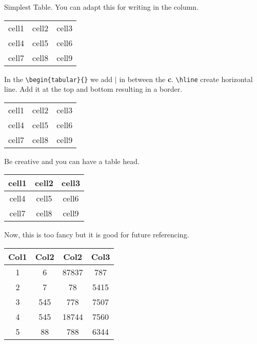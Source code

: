 \documentclass{article}
\begin{document}
Simplest Table. You can adapt this for writing in the column.

\begin{center}
    \begin{tabular}{c c c}
     cell1 & cell2 & cell3 \\ 
     cell4 & cell5 & cell6 \\  
     cell7 & cell8 & cell9    
    \end{tabular}
\end{center}


In the \verb!\begin{tabular}{}! we add $\mid$ in between the \textbf{c}.
\verb!\hline! create horizontal line. Add it at the top and bottom resulting in a border.

\begin{center}
    \begin{tabular}{|c|c|c|} 
     \hline
     cell1 & cell2 & cell3 \\ 
     cell4 & cell5 & cell6 \\ 
     cell7 & cell8 & cell9 \\ 
     \hline
    \end{tabular}
\end{center}

Be creative and you can have a table head.

\begin{center}
    \begin{tabular}{|c|c|c|} 
     \hline
     \textbf{cell1} & \textbf{cell2} & \textbf{cell3} \\ 
     \hline
     cell4 & cell5 & cell6 \\ 
     cell7 & cell8 & cell9 \\ 
     \hline
    \end{tabular}
\end{center}

Now, this is too fancy but it is good for future referencing.

\begin{center}
    \begin{tabular}{||c c c c||} 
    \hline
    Col1 & Col2 & Col2 & Col3 \\ [0.5ex] 
    \hline\hline
    1 & 6 & 87837 & 787 \\ 
    \hline
    2 & 7 & 78 & 5415 \\
    \hline
    3 & 545 & 778 & 7507 \\
    \hline
    4 & 545 & 18744 & 7560 \\
    \hline
    5 & 88 & 788 & 6344 \\ [1ex] 
    \hline
   \end{tabular}
\end{center}
\end{document}
